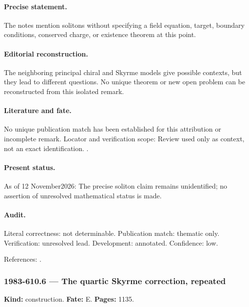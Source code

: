 \paragraph{Precise statement.} The notes mention solitons without specifying a field equation, target, boundary conditions, conserved charge, or existence theorem at this point.

\paragraph{Editorial reconstruction.} The neighboring principal chiral and Skyrme models give possible contexts, but they lead to different questions. No unique theorem or new open problem can be reconstructed from this isolated remark.

\paragraph{Literature and fate.} No unique publication match has been established for this attribution or incomplete remark. Locator and verification scope: Review used only as context, not an exact identification. \cite{perelomov1981instantons}.

\paragraph{Present status.} As of 12 November2026: The precise soliton claim remains unidentified; no assertion of unresolved mathematical status is made.

\paragraph{Audit.} Literal correctness: not determinable. Publication match: thematic only. Verification: unresolved lead. Development: annotated. Confidence: low.

\noindent References: \citep{perelomov1981instantons}.\par

\subsubsection{1983-610.6 --- The quartic Skyrme correction, repeated}

\label{item:1983-610.6}

\noindent\textbf{Kind:} construction. \textbf{Fate:} E. \textbf{Pages:} 1135.\par

